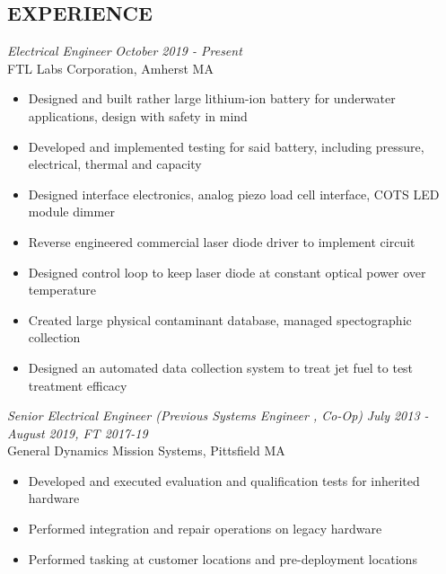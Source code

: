\documentclass[line,mmmargin]{res}
\begin{document}
\begin{resume}
\section{EXPERIENCE} 
{\sl Electrical Engineer} \hfill {\sl October 2019 - Present}\\
	FTL Labs Corporation, Amherst MA
	\begin{itemize}  \itemsep -2pt %
		\item Designed and built rather large lithium-ion battery for
			underwater applications, design with safety in mind
		\item Developed and implemented testing for said battery,
			including pressure, electrical, thermal and capacity
		\item Designed interface electronics, analog piezo
			load cell interface, COTS LED module dimmer
		\item Reverse engineered commercial laser diode driver to
			implement circuit
		\item Designed control loop to keep laser diode at constant
			optical power over temperature
		\item Created large physical contaminant database, managed
			spectographic collection
		\item Designed an automated data collection system to treat jet
			fuel to test treatment efficacy
	\end{itemize}
	\vspace{-10pt}
{\sl Senior Electrical Engineer (Previous Systems Engineer , Co-Op)} \hfill
{\sl July 2013 - August 2019, FT 2017-19}\\
	General Dynamics Mission Systems, Pittsfield MA
	\begin{itemize}  \itemsep -2pt %
		\item Developed and executed evaluation and qualification tests for inherited hardware
		\item Performed integration and repair operations on legacy hardware
		\item Performed tasking at customer locations and pre-deployment locations

\end{itemize}
\end{resume}
\end{document}
